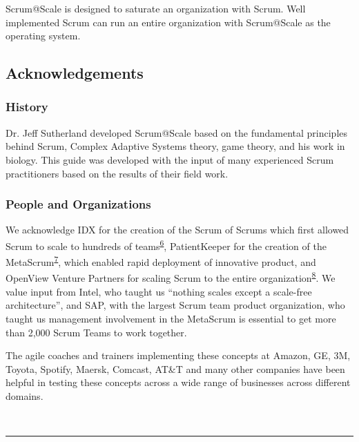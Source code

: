 \documentclass[12pt,a4paper,parskip=full]{scrartcl}
\begin{document}
Scrum@Scale is designed to saturate an organization with Scrum. Well
implemented Scrum can run an entire organization with Scrum@Scale as the
operating system.

\subsection{Acknowledgements}\label{Acknowledgements}

\subsubsection{History}\label{History}

Dr. Jeff Sutherland developed Scrum@Scale based on the fundamental
principles behind Scrum, Complex Adaptive Systems theory, game theory,
and his work in biology. This guide was developed with the input of many
experienced Scrum practitioners based on the results of their field
work.

\subsubsection{People and Organizations}\label{People-and-Organizations}

We acknowledge IDX for the creation of the Scrum of Scrums which first
allowed Scrum to scale to hundreds of
teams\textsuperscript{\hyperref[citation6]{6}}, PatientKeeper for the
creation of the MetaScrum\textsuperscript{\hyperref[citation7]{7}},
which enabled rapid deployment of innovative product, and OpenView
Venture Partners for scaling Scrum to the entire
organization\textsuperscript{\hyperref[citation8]{8}}. We value input
from Intel, who taught us ``nothing scales except a scale-free
architecture'', and SAP, with the largest Scrum team product
organization, who taught us management involvement in the MetaScrum is
essential to get more than 2,000 Scrum Teams to work together.

The agile coaches and trainers implementing these concepts at Amazon,
GE, 3M, Toyota, Spotify, Maersk, Comcast, AT\&T and many other companies
have been helpful in testing these concepts across a wide range of
businesses across different domains.

~

\begin{center}\rule{3in}{0.4pt}\end{center}
\end{document}
